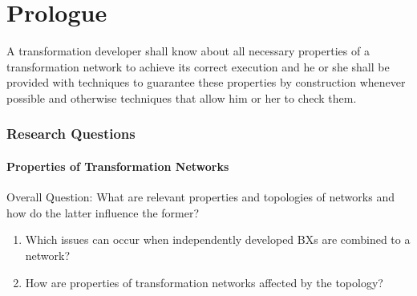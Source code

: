 \part{Prologue
}


\begin{researchgoal}
	A transformation developer shall know about all necessary properties of a transformation network to achieve its correct execution and he or she shall be provided with techniques to guarantee these properties by construction whenever possible and otherwise techniques that allow him or her to check them.
\end{researchgoal}

\section{Research Questions}

\subsection*{Properties of Transformation Networks}
Overall Question: What are relevant properties and topologies of networks and how do the latter influence the former?
\begin{enumerate}[label=\itshape RQ \arabic*.]
	\item Which issues can occur when independently developed \acp{BX} are combined to a network?
	\item How are properties of transformation networks affected by the topology?
\end{enumerate}

